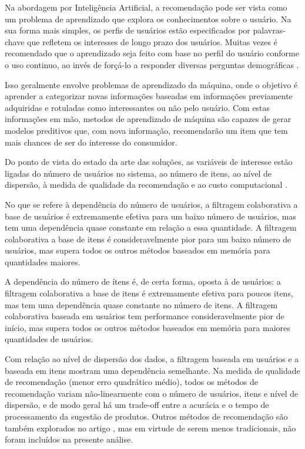 Na abordagem por Inteligência Artificial, a recomendação pode ser vista como um problema de aprendizado que explora os conhecimentos sobre o usuário. Na sua forma mais simples, os perfis de usuários estão especificados por palavras-chave que refletem os interesses de longo prazo dos usuários. Muitas vezes é recomendado que o aprendizado seja feito com base no perfil do usuário conforme o uso continuo, ao invés de forçá-lo a responder diversas perguntas demográficas \cite{wei2007survey}. 

Isso geralmente envolve problemas de aprendizado da máquina, onde o objetivo é aprender a categorizar novas informações baseadas em informações previamente adquiridas e rotuladas como interessantes ou não pelo usuário. Com estas informações em mão, metodos de aprendizado de máquina são capazes de gerar modelos preditivos que, com nova informação, recomendarão um item que tem mais chances de ser do interesse do consumidor.

Do ponto de vista do estado da arte das soluções, as variáveis de interesse estão ligadas do número de usuários no sistema, ao número de itens, ao nível de dispersão, à medida de qualidade da recomendação e ao custo computacional \cite{lee2012comparative}. 

No que se refere à dependência do número de usuários, a filtragem colaborativa a base de usuários é extremamente efetiva para um baixo número de usuários, mas tem uma dependência quase constante em relação a essa quantidade. A filtragem colaborativa a base de itens é consideravelmente pior para um baixo número de usuários, mas supera todos os outros métodos baseados em memória para quantidades maiores.

A dependência do número de ítens é, de certa forma, oposta à de usuários: a filtragem colaborativa a base de itens é extremamente efetiva para poucos itens, mas tem uma  
dependência quase constante no número de itens. A filtragem colaborativa baseada em usuários tem performance consideravelmente pior de início, mas supera todos os outros métodos baseados em memória para maiores quantidades de usuários.

Com relação ao nível de dispersão dos dados, a filtragem baseada em usuários e a baseada em itens mostram uma dependência semelhante. Na medida de qualidade de recomendação (menor erro quadrático médio), todos os métodos de recomendação variam não-linearmente com o número de usuários, itens e nível de dispersão, e de modo geral há um trade-off entre a acurácia e o tempo de processamento da sugestão de produtos. Outros métodos de recomendação são também explorados no artigo \cite{lee2012comparative}, mas em virtude de serem menos tradicionais, não foram incluídos na presente análise.

